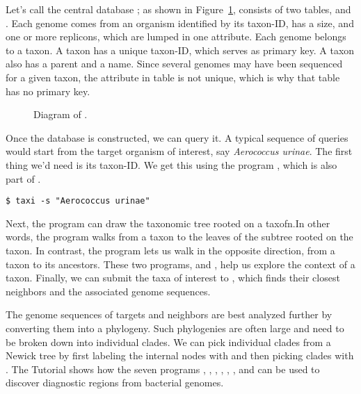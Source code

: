 Let's call the central database ; as shown in
Figure~\ref{fig:db},  consists of two
tables,  and . Each genome comes from an organism
identified by its taxon-ID, has a size, and one or more replicons,
which are lumped in one attribute. Each genome belongs to a taxon. A
taxon has a unique taxon-ID, which serves as primary key. A taxon also
has a parent and a name. Since several genomes may have been sequenced for a
given taxon, the attribute  in
table  is not unique, which is why that table has no
primary key.

\begin{figure}
  \begin{center}
    
  \end{center}
  \caption{Diagram of .}\label{fig:db}
\end{figure}

Once the database is constructed, we can query it. A typical sequence
of queries would start from the target organism of interest,
say \emph{Aerococcus urinae}. The first thing we'd need is its
taxon-ID. We get this using the program , which is also part
of .
\begin{verbatim}
$ taxi -s "Aerococcus urinae"
\end{verbatim}
Next, the program  can draw the taxonomic tree rooted on a
taxofn.In other words, the program  walks from a taxon to the
leaves of the subtree rooted on the taxon. In contrast, the
program  lets us walk in the opposite direction, from a taxon
to its ancestors. These two programs,  and , help us
explore the context of a taxon. Finally, we can submit the taxa of
interest to , which finds their closest neighbors and
the associated genome sequences.

The genome sequences of targets and neighbors are best analyzed
further by converting them into a phylogeny. Such phylogenies are
often large and need to be broken down into individual clades. We can
pick individual clades from a Newick tree by first labeling the
internal nodes with  and then picking clades
with . The Tutorial shows how the seven
programs , , , ,
, , and  can be used to discover
diagnostic regions from bacterial genomes.
